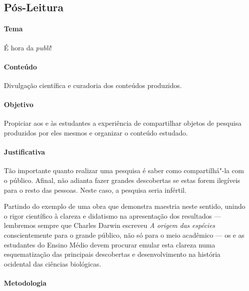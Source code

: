 \documentclass[11pt]{extarticle}
\begin{document}
\subsection{Pós-Leitura}

\paragraph{Tema} É hora da \emph{publi}!

\paragraph{Conteúdo} Divulgação científica e curadoria dos conteúdos produzidos.

\paragraph{Objetivo} Propiciar aos e às estudantes a experiência de 
compartilhar objetos de pesquisa produzidos por eles mesmos e organizar
o conteúdo estudado.

\paragraph{Justificativa} Tão importante quanto realizar uma pesquisa é
saber como compartilhá"-la com o público. Afinal, não adianta fazer grandes
descobertas se estas forem ilegíveis para o resto das pessoas. Neste caso,
a pesquisa seria infértil.

Partindo do exemplo de uma obra que demonstra maestria neste sentido,
unindo o rigor científico à clareza e didatismo na apresentação
dos resultados --- lembremos sempre que Charles Darwin escreveu \textit{A origem das espécies}
conscientemente para o grande público, não só para o meio acadêmico --- 
os e as estudantes do Ensino Médio devem procurar emular esta clareza
numa esquematização das principais descobertas e desenvolvimento
na história ocidental das ciências biológicas.

\paragraph{Metodologia}
\end{document}
